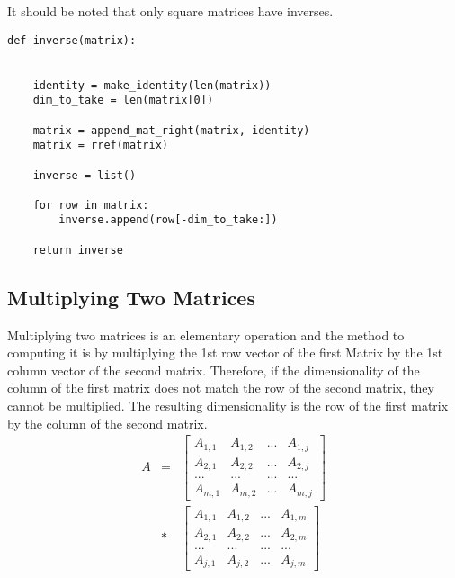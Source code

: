 \documentclass[12pt, a4paper]{article}
\begin{document}
It should be noted that only square matrices have inverses. 

\begin{lstlisting}
def inverse(matrix):
    

    identity = make_identity(len(matrix))
    dim_to_take = len(matrix[0])

    matrix = append_mat_right(matrix, identity)
    matrix = rref(matrix)

    inverse = list()

    for row in matrix:
        inverse.append(row[-dim_to_take:])

    return inverse
\end{lstlisting}

\subsection{Multiplying Two Matrices}

Multiplying two matrices is an elementary operation and the method to computing it is by multiplying the 1st row vector of the first Matrix by the 1st column vector of the second matrix. 
Therefore, if the dimensionality of the column of the first matrix does not match the row of the second matrix, they cannot be multiplied. The resulting dimensionality is the row of the first matrix by the column of the second matrix.
\begin{eqnarray*}
    A & = & \begin{bmatrix}
        A_{1,1}  & A_{1,2} & ... & A_{1,j}\\
        A_{2,1} & A_{2,2} & ... & A_{2,j}\\
        ... & ... & ... & ... \\
        A_{m,1}& A_{m,2} & ... & A_{m,j}
    \end{bmatrix} \\     
    & * & \begin{bmatrix}
        A_{1,1}  & A_{1,2} & ... & A_{1,m}\\
        A_{2,1} & A_{2,2} & ... & A_{2,m}\\
        ... & ... & ... & ... \\
        A_{j,1}& A_{j,2} & ... & A_{j,m}
    \end{bmatrix}
\end{eqnarray*}
\end{document}
